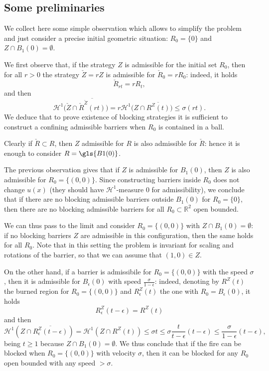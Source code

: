 \documentclass[reqno]{amsart}
\newcounter{assu}
\theoremstyle{definition} \newtheorem{definition}{Definition}[section]
\theoremstyle{definition} \newtheorem{remark}[definition]{Remark}
\theoremstyle{plain} \newtheorem{lemma}[definition]{Lemma}
\theoremstyle{plain} \newtheorem{proposition}[definition]{Proposition}
\theoremstyle{plain} \newtheorem{theorem}[definition]{Theorem}
\theoremstyle{plain} \newtheorem{corollary}[definition]{Corollary}
\theoremstyle{definition} \newtheorem{example}[definition]{Example}
\theoremstyle{plain} \newtheorem{claim}[clai]{Claim}
\theoremstyle{definition} \newtheorem{assumption}[definition]{Assumption}
\theoremstyle{definition} \newtheorem{observation}[definition]{Observation}
\newcommand{\R}{\mathbb{R}}
\newcommand{\1}{\mathbbm 1}
\renewcommand{\H}{\mathscr H}
\numberwithin{equation}{section} %
\theoremstyle{plain} \newtheorem*{theorem*}{Theorem}
\theoremstyle{plain} \newtheorem{mthm}[maintheorem]{Main Theorem}
\theoremstyle{plain} \newtheorem*{mthm*}{Main Theorem}
\theoremstyle{plain} \newtheorem*{conjecture*}{Conjecture}
\theoremstyle{plain} \newtheorem{conjecture}[definition]{Conjecture}
\theoremstyle{plain} \newtheorem*{problem*}{Problem}
\begin{document}
\subsection{Some preliminaries}
\label{Ss:prelimnaries}


We collect here some simple observation which allows to simplify the problem and just consider a precise initial geometric situation: $R_0 = \{0\}$ and $Z \cap B_1(0) = \emptyset$.

We first observe that, if the strategy $Z$ is admissible for the initial set $R_0$, then for all $r > 0$ the strategy $\check Z = rZ$ is admissible for $\check R_0 = r R_0$: indeed, it holds
\begin{equation*}
\check R_{rt} = r R_t, 
\end{equation*}
and then
\begin{equation*}
\mathcal H^1 \big( \check Z \cap \overline{\check R^{\check Z}(rt)} \big) = r \mathcal H^1 \big( Z \cap \overline{R^{Z}(t)} \big) \leq \sigma (r t).
\end{equation*}
We deduce that to prove existence of blocking strategies it is sufficient to construct a confining admissible barriers when $R_0$ is contained in a ball.

Clearly if $\check R \subset R$, then $Z$ admissible for $R$ is also admissible for $\check R$: hence it is enough to consider  $R = \gls{B1(0)}$.

The previous observation gives that if $Z$ is admissible for $B_1(0)$, then $Z$ is also admissible for $R_0 = \{(0,0)\}$. Since  constructing barriers inside $R_0$ does not change $u(x)$ (they should have $\H^1$-measure $0$ for admissibility), we conclude that if there are no blocking admissible barriers outside $B_1(0)$ for $R_0 = \{0\}$, then there are no blocking admissible barriers for all $R_0 \subset \R^2$ open bounded.

We can thus pass to the limit and consider $R_0 = \{(0,0)\}$ with $Z \cap B_1(0) = \emptyset$: if no blocking barriers $Z$ are admissible in this configuration, then the same holds for all $R_0$. Note that in this setting the problem is invariant for scaling and rotations of the barrier, so that we can assume that $(1,0) \in Z$.

On the other hand, if a barrier is admissibile for $R_0 = \{(0,0)\}$ with the speed $\sigma$, then it is admissible for $B_\epsilon(0)$ with speed $\frac{\sigma}{1-\epsilon}$: indeed, denoting by $R^Z(t)$ the burned region for $R_0 = \{(0,0)\}$ and $R^Z_\epsilon(t)$ the one with $R_0 = B_\epsilon(0)$, it holds
$$
R_{\epsilon}^Z(t-\epsilon) = R^Z(t)
$$
and then
\begin{equation*}
\mathcal H^1(Z \cap \overline{R^Z_\epsilon
(t-\epsilon)}) = \mathcal H^1(Z \cap R^Z(t)) \leq \sigma t \leq \sigma \frac{t}{t-\epsilon} (t - \epsilon) \leq \frac{\sigma}{1 - \epsilon} (t-\epsilon),
\end{equation*}
being $t \geq 1$ because $Z \cap B_1(0) = \emptyset$. We thus conclude that if the fire can be blocked when $R_0 = \{(0,0)\}$ with velocity $\sigma$, then it can be blocked for any $R_0$ open bounded with any speed $> \sigma$.
\end{document}

